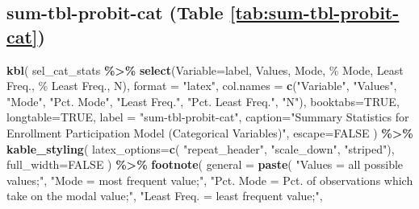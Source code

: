 \documentclass[
]{article}
\newenvironment{Shaded}{\begin{snugshade}}{\end{snugshade}}
\newcommand{\AttributeTok}[1]{\textcolor[rgb]{0.13,0.29,0.53}{#1}}
\newcommand{\ConstantTok}[1]{\textcolor[rgb]{0.56,0.35,0.01}{#1}}
\newcommand{\FunctionTok}[1]{\textcolor[rgb]{0.13,0.29,0.53}{\textbf{#1}}}
\newcommand{\NormalTok}[1]{#1}
\newcommand{\SpecialCharTok}[1]{\textcolor[rgb]{0.81,0.36,0.00}{\textbf{#1}}}
\newcommand{\StringTok}[1]{\textcolor[rgb]{0.31,0.60,0.02}{#1}}
\begin{document}
\subsection*{sum-tbl-probit-cat (Table \ref{tab:sum-tbl-probit-cat})}\label{sum-tbl-probit-cat-table-reftabsum-tbl-probit-cat}

\begin{Shaded}
\begin{Highlighting}[]
\FunctionTok{kbl}\NormalTok{(}
\NormalTok{  sel\_cat\_stats }\SpecialCharTok{\%\textgreater{}\%}
      \FunctionTok{select}\NormalTok{(}\AttributeTok{Variable=}\NormalTok{label, Values, Mode, }\StringTok{\textasciigrave{}}\AttributeTok{\% Mode}\StringTok{\textasciigrave{}}\NormalTok{, }\StringTok{\textasciigrave{}}\AttributeTok{Least Freq.}\StringTok{\textasciigrave{}}\NormalTok{, }\StringTok{\textasciigrave{}}\AttributeTok{\% Least Freq.}\StringTok{\textasciigrave{}}\NormalTok{, N),}
  \AttributeTok{format =} \StringTok{"latex"}\NormalTok{,}
  \AttributeTok{col.names =} \FunctionTok{c}\NormalTok{(}\StringTok{"Variable"}\NormalTok{, }\StringTok{"Values"}\NormalTok{, }\StringTok{"Mode"}\NormalTok{, }\StringTok{"Pct. Mode"}\NormalTok{, }\StringTok{"Least Freq."}\NormalTok{, }\StringTok{"Pct. Least Freq."}\NormalTok{, }\StringTok{"N"}\NormalTok{),}
  \AttributeTok{booktabs=}\ConstantTok{TRUE}\NormalTok{, }
  \AttributeTok{longtable=}\ConstantTok{TRUE}\NormalTok{,}
  \AttributeTok{label =} \StringTok{"sum{-}tbl{-}probit{-}cat"}\NormalTok{, }
  \AttributeTok{caption=}\StringTok{"Summary Statistics for Enrollment Participation Model (Categorical Variables)"}\NormalTok{,}
  \AttributeTok{escape=}\ConstantTok{FALSE}
\NormalTok{  ) }\SpecialCharTok{\%\textgreater{}\%}
  \FunctionTok{kable\_styling}\NormalTok{(}
    \AttributeTok{latex\_options=}\FunctionTok{c}\NormalTok{(}
      \StringTok{"repeat\_header"}\NormalTok{,}
      \StringTok{"scale\_down"}\NormalTok{,}
      \StringTok{"striped"}\NormalTok{), }
    \AttributeTok{full\_width=}\ConstantTok{FALSE}
\NormalTok{  ) }\SpecialCharTok{\%\textgreater{}\%}
  \FunctionTok{footnote}\NormalTok{(}
    \AttributeTok{general =} \FunctionTok{paste}\NormalTok{(}
      \StringTok{"\textquotesingle{}Values\textquotesingle{} = all possible values;"}\NormalTok{,}
      \StringTok{"\textquotesingle{}Mode\textquotesingle{} = most frequent value;"}\NormalTok{,}
      \StringTok{"\textquotesingle{}Pct. Mode\textquotesingle{} = Pct. of observations which take on the modal value;"}\NormalTok{,}
      \StringTok{"\textquotesingle{}Least Freq.\textquotesingle{} = least frequent value;"}\NormalTok{,}

\end{Highlighting}
\end{Shaded}
\end{document}
